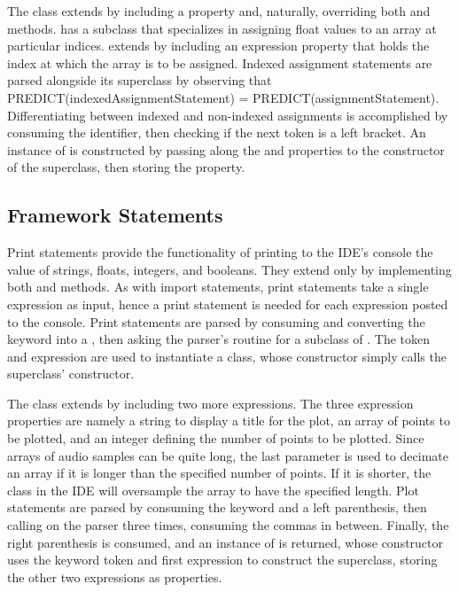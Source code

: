 The  class extends  by including a  property and, naturally, overriding both  and  methods.  has a subclass that specializes in assigning float values to an array at particular indices.  extends  by including an expression property that holds the index at which the array is to be assigned. Indexed assignment statements are parsed alongside its superclass by observing that PREDICT(indexedAssignmentStatement) = PREDICT(assignmentStatement). Differentiating between indexed and non-indexed assignments is accomplished by consuming the identifier, then checking if the next token is a left bracket. An instance of  is constructed by passing along the  and  properties to the constructor of the superclass, then storing the  property.

\subsection{Framework Statements}

Print statements provide the functionality of printing to the IDE's console the value of strings, floats, integers, and booleans. They extend  only by implementing both  and  methods. As with import statements, print statements take a single expression as input, hence a print statement is needed for each expression posted to the console. Print statements are parsed by consuming and converting the  keyword into a , then asking the parser's  routine for a subclass of . The token and expression are used to instantiate a  class, whose constructor simply calls the superclass' constructor.

The  class extends  by including two more expressions. The three expression properties are namely a string to display a title for the plot, an array of points to be plotted, and an integer defining the number of points to be plotted. Since arrays of audio samples can be quite long, the last parameter is used to decimate an array if it is longer than the specified number of points. If it is shorter, the  class in the IDE will oversample the array to have the specified length. Plot statements are parsed by consuming the keyword and a left parenthesis, then calling  on the parser three times, consuming the commas in between. Finally, the right parenthesis is consumed, and an instance of  is returned, whose constructor uses the keyword token and first expression to construct the superclass, storing the other two expressions as properties.

